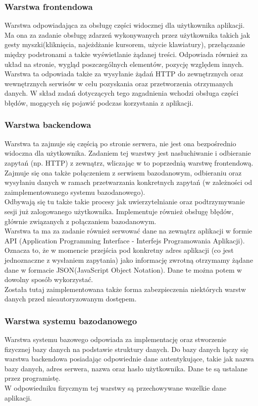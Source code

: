 \documentclass[eng,printmode]{mgr}
\begin{document}
\subsubsection{Warstwa frontendowa}
Warstwa odpowiadająca za obsługę części widocznej dla użytkownika aplikacji. Ma ona za zadanie obsługę zdarzeń wykonywanych przez użytkownika takich jak gesty myszki(kliknięcia, najeżdżanie kursorem, użycie klawiatury), przełączanie między podstronami a także wyświetlanie żądanej treści. Odpowiada również za układ na stronie, wygląd poszczególnych elementów, pozycję względem innych.
\\
Warstwa ta odpowiada także za wysyłanie żądań HTTP do zewnętrznych oraz wewnętrznych serwisów w celu pozyskania oraz przetworzenia otrzymanych danych. W skład zadań dotyczących tego zagadnienia wchodzi obsługa części błędów, mogących się pojawić podczas korzystania z aplikacji.
\subsubsection{Warstwa backendowa}
Warstwa ta zajmuje się częścią po stronie serwera, nie jest ona bezpośrednio widoczna dla użytkownika. Zadaniem tej warstwy jest nasłuchiwanie i odbieranie zapytań (np. HTTP) z zewnątrz, wliczając w to poprzednią warstwę frontendową. Zajmuje się ona także połączeniem z serwisem bazodanowym, odbieraniu oraz wysyłaniu danych w ramach przetwarzania konkretnych zapytań (w zależności od zaimplementowanego systemu bazodanowego).
\\
Odbywają się tu także takie procesy jak uwierzytelnianie oraz podtrzymywanie sesji już zalogowanego użytkownika. Implementuje również obsługę błędów, głównie związanych z połączaniem bazodanowym.
\\
Warstwa ta ma za zadanie również serwować dane na zewnątrz aplikacji w formie API (Application Programming Interface - Interfejs Programowania Aplikacji)\cite{API}. Oznacza to, że w momencie przejścia pod konkretny adres aplikacji (co jest jednoznaczne z wysłaniem zapytania) jako informację zwrotną otrzymamy żądane dane w formacie JSON(JavaScript Object Notation)\cite{JSON}. Dane te można potem w dowolny sposób wykorzystać.
\\
Została tutaj zaimplementowana także forma zabezpieczenia niektórych warstw danych przed nieautoryzowanym dostępem.
\subsubsection{Warstwa systemu bazodanowego}
Warstwa systemu bazowego odpowiada za implementację oraz stworzenie fizycznej bazy danych na podstawie struktury danych. Do bazy danych łączy się warstwa backendowa posiadając odpowiednie dane autentykujące, takie jak nazwa bazy danych, adres serwera, nazwa oraz hasło użytkownika. Dane te są ustalane przez programistę.
\\
W odpowiedniku fizycznym tej warstwy są przechowywane wszelkie dane aplikacji.
\end{document}
